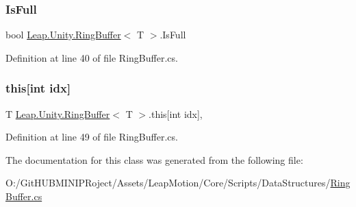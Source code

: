 \subsubsection{\texorpdfstring{IsFull}{IsFull}}
{\footnotesize\ttfamily bool \mbox{\hyperlink{class_leap_1_1_unity_1_1_ring_buffer}{Leap.\+Unity.\+Ring\+Buffer}}$<$ T $>$.Is\+Full\hspace{0.3cm}{\ttfamily [get]}}



Definition at line 40 of file Ring\+Buffer.\+cs.

\mbox{\label{class_leap_1_1_unity_1_1_ring_buffer_a78141075db5bb630c84bd9065939f235}} 
\subsubsection{\texorpdfstring{this[int idx]}{this[int idx]}}
{\footnotesize\ttfamily T \mbox{\hyperlink{class_leap_1_1_unity_1_1_ring_buffer}{Leap.\+Unity.\+Ring\+Buffer}}$<$ T $>$.this\mbox{[}int idx\mbox{]}\hspace{0.3cm}{\ttfamily [get]}, {\ttfamily [set]}}



Definition at line 49 of file Ring\+Buffer.\+cs.



The documentation for this class was generated from the following file\+:\begin{DoxyCompactItemize}
\item 
O\+:/\+Git\+H\+U\+B\+M\+I\+N\+I\+P\+Roject/\+Assets/\+Leap\+Motion/\+Core/\+Scripts/\+Data\+Structures/\mbox{\hyperlink{_ring_buffer_8cs}{Ring\+Buffer.\+cs}}\end{DoxyCompactItemize}

